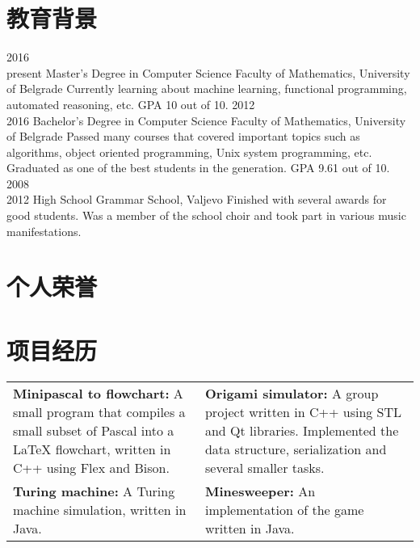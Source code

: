 \documentclass[a4paper]{my_cv}
\newcommand{\hei}{\CJKfamily{hei}}                          %
\begin{document}
\section{\hei 教育背景}
\begin{entrylist}
  \entry
    {2016~\textemdash \\present}
    {Master's Degree in Computer Science}
    {Faculty of Mathematics, University of Belgrade}
    {Currently learning about machine learning, functional programming, automated reasoning, etc. GPA 10 out of 10.}
  \entry
    {2012~\textemdash \\2016}
    {Bachelor's Degree in Computer Science}
    {Faculty of Mathematics, University of Belgrade}
    {Passed many courses that covered important topics such as algorithms, object oriented programming, Unix system programming, etc. Graduated as one of the best students in the generation. GPA 9.61 out of 10.}
  \entry
    {2008~\textemdash \\2012}
    {High School}
    {Grammar School, Valjevo}
    {Finished with several awards for good students. Was a member of the school choir and took part in various music manifestations.}
\end{entrylist}

\section{\hei 个人荣誉}
\bodyfont
\begin{aplist}
\end{aplist}

\section{\hei 项目经历}
\setlength{\tabcolsep}{6pt}
\begin{tabularx}{1.07\textwidth}{XX}
\textbf{Minipascal to flowchart:} A small program that compiles a small subset of Pascal into a LaTeX flowchart, written in C++ using Flex and Bison. &
\textbf{Origami simulator:} A group project written in C++ using STL and Qt libraries. Implemented the data structure, serialization and several smaller tasks. \\
\textbf{Turing machine:} A Turing machine simulation, written in Java. &
\textbf{Minesweeper:} An implementation of the game written in Java. \\
\end{tabularx}
~
\end{document}
